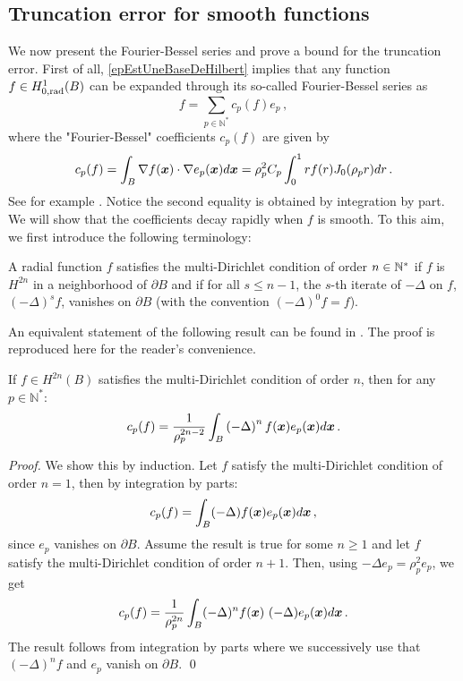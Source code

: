\documentclass[smallextended]{svjour3}
\begin{document}
\subsection{Truncation error for smooth functions}
\label{FourierBesselTruncError}
We now present the Fourier-Bessel series and prove a bound for the truncation error. First of all, \autoref{epEstUneBaseDeHilbert} implies that any function $f \in H^1_{0,\textup{rad}}(B)$ can be expanded through its so-called Fourier-Bessel series as
\[f = \sum_{p\in \mathbb{N}^*}c_p(f)e_{p}\,,\]
where the "Fourier-Bessel" coefficients $c_p(f)$ are given by
\[c_p(f) = \displaystyle \int_B \nabla f(\boldsymbol{x}) \cdot \nabla e_{p}(\boldsymbol{x}) d\boldsymbol{x} = \rho_p ^2 C_p\int_{0}^1 r f(r) J_0(\rho_p r) dr\,.\]
See for example \cite[Chap. 18, Eq. (2)]{watson1995treatise}. Notice the second equality is obtained by integration by part. We will show that the coefficients decay rapidly when $f$ is smooth. To this aim, we first introduce the following terminology: 
\begin{definition}
	A radial function $f$ satisfies the multi-Dirichlet condition of order $n \in \mathbb{N}^*$ if $f$ is $H^{2n}$ in a neighborhood of $\partial B$ and if for all $s \leq n-1$, the $s$-th iterate of $-\Delta$ on $f$, $(-\Delta)^s f$, vanishes on $\partial B$ (with the convention $(-\Delta)^0 f = f$). 
\end{definition}
An equivalent statement of the following result can be found in \cite[Chap. 8, Sec. 20, Thm. 1]{tolstov2012fourier}. The proof is reproduced here for the reader's convenience. 
\begin{proposition} 
	\label{DecroissanceFourierBessel}
	If $f \in H^{2n}(B)$ satisfies the multi-Dirichlet condition of order $n$, then for any $p \in \mathbb{N}^*$:
	\[ c_p(f) = \dfrac{1}{\rho_{p}^{2n-2}} \int_{B}\left(-\Delta\right)^{n} f(\boldsymbol{x})e_p(\boldsymbol{x}) d\boldsymbol{x}\,.\] 
\end{proposition}
\begin{proof}
	We show this by induction. Let $f$ satisfy the multi-Dirichlet condition of order $n=1$, then by integration by parts:
	\[c_p(f) = \int_{B}(-\Delta)f(\boldsymbol{x}) e_p(\boldsymbol{x})d\boldsymbol{x}\,,\]
	since $e_p$ vanishes on $\partial B$.
	Assume the result is true for some $n \geq 1$ and let $f$ satisfy the multi-Dirichlet condition of order $n+1$. Then, using $-\Delta e_p = \rho_p^2e_p$, we get
	\[c_p(f) = \frac{1}{\rho_p^{2n}}\int_{B}(-\Delta)^{n}f(\boldsymbol{x})~ (-\Delta) e_p(\boldsymbol{x}) d\boldsymbol{x}\,.\]
	The result follows from integration by parts where we successively use that $(-\Delta)^{n}f$ and $e_p$ vanish on $\partial B$.
	\qed
\end{proof}
			
\end{document}

